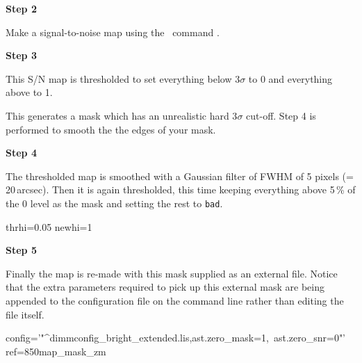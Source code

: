 \documentclass[11pt,oneside,chapters]{starlink}
\begin{document}
\begin{minipage}[t]{0.1\linewidth}
\textbf{Step 2}
\end{minipage}
\begin{minipage}[t]{0.9\linewidth}Make a signal-to-noise map using the \Kappa\ command
\makesnr.
\begin{terminalv}
\end{terminalv}
\end{minipage}


\begin{minipage}[t]{0.1\linewidth}
\textbf{Step 3}
\end{minipage}
\begin{minipage}[t]{0.9\linewidth}This S/N map is thresholded to set everything below
3$\sigma$ to 0 and everything above to 1.
\begin{terminalv}
\end{terminalv}
This generates a mask which has an unrealistic hard 3$\sigma$ cut-off. Step 4
is performed to smooth the the edges of your mask.\\
\end{minipage}


\begin{minipage}[t]{0.1\linewidth}
\textbf{Step 4}
\end{minipage}
\begin{minipage}[t]{0.9\linewidth}The thresholded map is smoothed with a Gaussian filter
of FWHM of 5 pixels (=\,20\,arcsec). Then it is again thresholded, this time
keeping everything above 5\,\% of the 0 level as the mask and setting
the rest to \texttt{bad}.
\begin{terminalv}
  thrhi=0.05 newhi=1
\end{terminalv}
\end{minipage}


\begin{minipage}[t]{0.1\linewidth}
\textbf{Step 5}
\end{minipage}
\begin{minipage}[t]{0.9\linewidth}Finally the map is re-made with this mask supplied as an external
file. Notice that the extra parameters required to pick up this external
mask are being appended to the configuration file on the command line
rather than editing the file itself.
\begin{terminalv}
  config='"^dimmconfig_bright_extended.lis,ast.zero_mask=1,\
  ast.zero_snr=0"' ref=850map_mask_zm
\end{terminalv}
\end{minipage}
\end{document}

